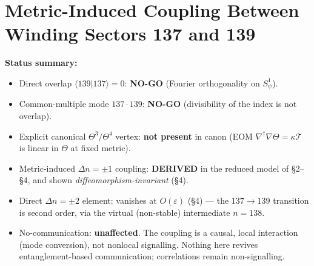 

\section{Metric-Induced Coupling Between Winding Sectors 137 and 139}
\label{sec:g137_139_bridge}

\noindent\textbf{Status summary:}
\begin{itemize}
  \item Direct overlap $\langle 139|137\rangle = 0$: \textbf{NO-GO} (Fourier orthogonality on $S^1_\psi$).
  \item Common-multiple mode $137\cdot139$: \textbf{NO-GO} (divisibility of the index is not overlap).
  \item Explicit canonical $\Theta^3/\Theta^4$ vertex: \textbf{not present} in canon
        (EOM $\nabla^\dagger\nabla\Theta = \kappa\mathcal{T}$ is linear in $\Theta$ at fixed metric).
  \item Metric-induced $\Delta n = \pm 1$ coupling: \textbf{DERIVED} in the reduced model of §2–§4,
        and shown \emph{diffeomorphism-invariant} (§4).
  \item Direct $\Delta n = \pm 2$ element: vanishes at $O(\varepsilon)$ (§4) — the $137\to139$
        transition is second order, via the virtual (non-stable) intermediate $n=138$.
  \item No-communication: \textbf{unaffected}. The coupling is a causal, local interaction
        (mode conversion), not nonlocal signalling. Nothing here revives entanglement-based
        communication; correlations remain non-signalling.
\end{itemize}

